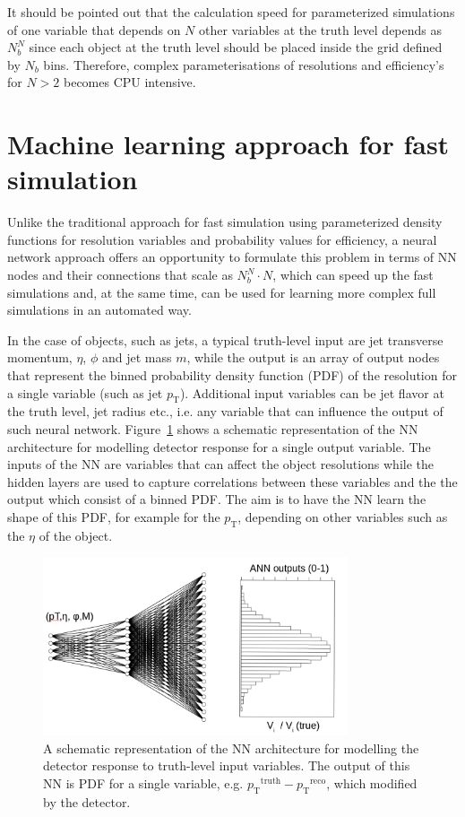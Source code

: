 \documentclass[showpacs,showkeys,preprint,prd,nofootinbib,linenumbers,12pt,superscriptaddress]{revtex4-1}
\def\pt{\ensuremath{p_{\mathrm{T}}}}
\def\ptRes{\ensuremath{\pt^{\mathrm{truth}}-\pt^{\mathrm{reco}}}}
\begin{document}
It should be pointed out that the calculation speed for parameterized simulations of one variable that depends on $N$ other variables at the truth level depends  as $N_b^N$ since each object at the truth level should be placed inside the grid defined by $N_b$ bins. Therefore, complex parameterisations of resolutions and efficiency's for $N>2$ becomes CPU intensive. 

\section{Machine learning approach for fast simulation}

Unlike the traditional approach for fast simulation using parameterized density functions for resolution variables and probability values for efficiency, a neural network approach offers an opportunity to formulate this problem in terms of NN nodes and their connections that scale as $N_b^N \cdot N$, which can speed up the fast simulations and, at the same time, can be used for learning more complex full simulations in an automated way.

In the case of objects, such as jets, a typical truth-level input are jet transverse momentum, $\eta$, $\phi$ and jet mass $m$, while the output
is an array of output nodes that represent the binned probability density function (PDF) of the resolution for a single variable (such as jet \pt). Additional input variables can be jet flavor at the truth level, jet radius etc., i.e. any variable that 
can influence the output of such neural network. Figure~\ref{ann_example} shows a schematic representation of the NN architecture for modelling detector response for a single output variable. The inputs of the NN are variables that can affect the object resolutions while the hidden layers are used to capture correlations between these variables and the the output which consist of a binned PDF. The aim is to have the NN learn the shape of this PDF, for example for the $\pt$, depending on other variables such as the $\eta$ of the object.

\begin{figure}[h]
  \includegraphics[width=0.8\textwidth]{figures/intro/nn_example.png}
  \caption{A schematic representation of the NN architecture for modelling the detector response to truth-level input variables. The output of this NN is PDF for a single variable, e.g. \ptRes, which modified by the detector.}
  \label{ann_example}
\end{figure}
\end{document}
